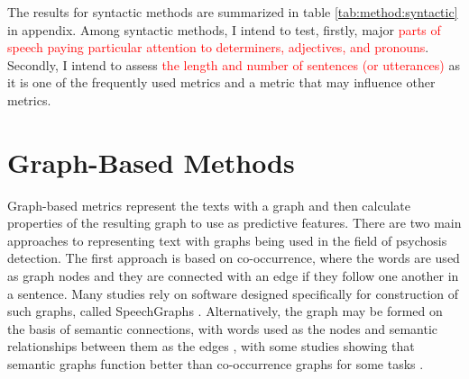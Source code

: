 The results for syntactic methods are summarized in table \ref{tab:method:syntactic} in appendix. Among syntactic methods, I intend to test, firstly, major \textcolor{red}{parts of speech paying particular attention to determiners, adjectives, and pronouns}. Secondly, I intend to assess \textcolor{red}{the length and number of sentences (or utterances)} as it is one of the frequently used metrics and a metric that may influence other metrics.

\section{Graph-Based Methods}
\label{sec:review:graph}



Graph-based metrics represent the texts with a graph and then calculate properties of the resulting graph to use as predictive features. There are two main approaches to representing text with graphs being used in the field of psychosis detection. The first approach is based on co-occurrence, where the words are used as graph nodes and they are connected with an edge if they follow one another in a sentence. Many studies rely on software designed specifically for construction of such graphs, called SpeechGraphs \citep{mota2012speech, mota2014graph}. Alternatively, the graph may be formed on the basis of semantic connections, with words used as the nodes and semantic relationships between them as the edges \citep{nikzad2022does, nettekoven2023semantic}, with some studies showing that semantic graphs function better than co-occurrence graphs for some tasks \citep{nikzad2022does}.

